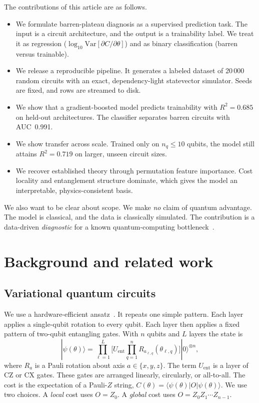 \documentclass[aps,pra,preprint,amsmath,amssymb,floatfix,nofootinbib]{revtex4-2}
\newcommand{\Nrows}{20\,000}
\newcommand{\RsqHold}{0.685}
\newcommand{\AucHold}{0.991}
\newcommand{\ExtrapCut}{10}
\newcommand{\RsqExtrap}{0.719}
\begin{document}
The contributions of this article are as follows.
\begin{itemize}
\item We formulate barren-plateau diagnosis as a supervised prediction task. The
input is a circuit architecture, and the output is a trainability label. We treat
it as regression ($\log_{10}\mathrm{Var}[\partial C/\partial\theta]$) and as
binary classification (barren versus trainable).
\item We release a reproducible pipeline. It generates a labeled dataset of
\Nrows{} random circuits with an exact, dependency-light statevector simulator.
Seeds are fixed, and rows are streamed to disk.
\item We show that a gradient-boosted model predicts trainability with
$R^2=\RsqHold{}$ on held-out architectures. The classifier separates barren
circuits with AUC~\AucHold{}.
\item We show transfer across scale. Trained only on $n_q\le\ExtrapCut{}$ qubits,
the model still attains $R^2=\RsqExtrap{}$ on larger, unseen circuit sizes.
\item We recover established theory through permutation feature importance. Cost
locality and entanglement structure dominate, which gives the model an
interpretable, physics-consistent basis.
\end{itemize}

We also want to be clear about scope. We make \emph{no} claim of quantum
advantage. The model is classical, and the data is classically simulated. The
contribution is a data-driven \emph{diagnostic} for a known quantum-computing
bottleneck~\cite{schuld2022killoran,bowles2024benchmarking}.

\section{Background and related work}

\subsection{Variational quantum circuits}
We use a hardware-efficient ansatz~\cite{kandala2017hardware}. It repeats one
simple pattern. Each layer applies a single-qubit rotation to every qubit. Each
layer then applies a fixed pattern of two-qubit entangling gates. With $n$ qubits
and $L$ layers the state is
\begin{equation}
|\psi(\theta)\rangle = \prod_{\ell=1}^{L}
  \Big[ U_{\mathrm{ent}} \prod_{q=1}^{n} R_{a_{\ell,q}}(\theta_{\ell,q}) \Big]
  |0\rangle^{\otimes n},
\end{equation}
where $R_a$ is a Pauli rotation about axis $a\in\{x,y,z\}$. The term
$U_{\mathrm{ent}}$ is a layer of CZ or CX gates. These gates are arranged
linearly, circularly, or all-to-all. The cost is the expectation of a Pauli-$Z$
string, $C(\theta)=\langle\psi(\theta)|O|\psi(\theta)\rangle$. We use two
choices. A \emph{local} cost uses $O=Z_0$. A \emph{global} cost uses
$O=Z_0Z_1\cdots Z_{n-1}$.
\end{document}
